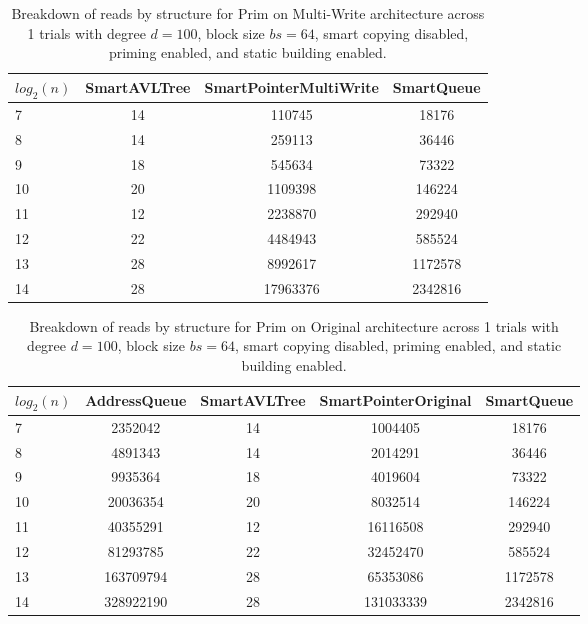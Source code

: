 \begin{table}[]
\centering
\begin{tabular}{|l|c|c|c|}
$log_2(n)$ & SmartAVLTree & SmartPointerMultiWrite & SmartQueue \\ \hline
7 & 14 & 110745 & 18176 \\ \hline
8 & 14 & 259113 & 36446 \\ \hline
9 & 18 & 545634 & 73322 \\ \hline
10 & 20 & 1109398 & 146224 \\ \hline
11 & 12 & 2238870 & 292940 \\ \hline
12 & 22 & 4484943 & 585524 \\ \hline
13 & 28 & 8992617 & 1172578 \\ \hline
14 & 28 & 17963376 & 2342816 \\ \hline
\end{tabular}
\caption{Breakdown of reads by structure for Prim on Multi-Write architecture across 1 trials with degree $d=100$, block size $bs=64$, smart copying disabled, priming enabled, and static building enabled.}
    \label{tab:reads_by_structure_prim_d100_bs64_trials1_copiesfalse_primetrue_staticinsertiontrue_ptmultiwrite_movetrue}
\end{table}

\begin{table}[]
\centering
\begin{tabular}{|l|c|c|c|c|}
$log_2(n)$ & AddressQueue & SmartAVLTree & SmartPointerOriginal & SmartQueue \\ \hline
7 & 2352042 & 14 & 1004405 & 18176 \\ \hline
8 & 4891343 & 14 & 2014291 & 36446 \\ \hline
9 & 9935364 & 18 & 4019604 & 73322 \\ \hline
10 & 20036354 & 20 & 8032514 & 146224 \\ \hline
11 & 40355291 & 12 & 16116508 & 292940 \\ \hline
12 & 81293785 & 22 & 32452470 & 585524 \\ \hline
13 & 163709794 & 28 & 65353086 & 1172578 \\ \hline
14 & 328922190 & 28 & 131033339 & 2342816 \\ \hline
\end{tabular}
\caption{Breakdown of reads by structure for Prim on Original architecture across 1 trials with degree $d=100$, block size $bs=64$, smart copying disabled, priming enabled, and static building enabled.}
    \label{tab:reads_by_structure_prim_d100_bs64_trials1_copiesfalse_primetrue_staticinsertiontrue_ptoriginal_movefalse}
\end{table}

